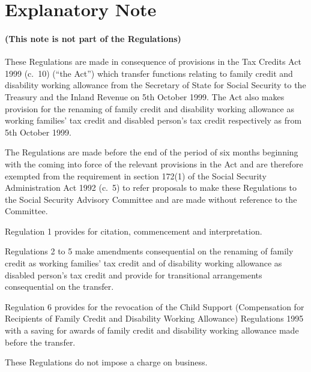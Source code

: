 \documentclass[12pt,a4paper]{article}
\begin{document}
\part{Explanatory Note}

\renewcommand\parthead{— Explanatory Note}

\subsection*{(This note is not part of the Regulations)}

These Regulations are made in consequence of provisions in the Tax Credits Act 1999 (c.\ 10) (“the Act”) which transfer functions relating to family credit and disability working allowance from the Secretary of State for Social Security to the Treasury and the Inland Revenue on 5th October 1999. The Act also makes provision for the renaming of family credit and disability working allowance as working families' tax credit and disabled person’s tax credit respectively as from 5th October 1999.

The Regulations are made before the end of the period of six months beginning with the coming into force of the relevant provisions in the Act and are therefore exempted from the requirement in section 172(1) of the Social Security Administration Act 1992 (c.\ 5) to refer proposals to make these Regulations to the Social Security Advisory Committee and are made without reference to the Committee.

Regulation 1 provides for citation, commencement and interpretation.

Regulations 2 to 5 make amendments consequential on the renaming of family credit as working families' tax credit and of disability working allowance as disabled person’s tax credit and provide for transitional arrangements consequential on the transfer.

Regulation 6 provides for the revocation of the Child Support (Compensation for Recipients of Family Credit and Disability Working Allowance) Regulations 1995 with a saving for awards of family credit and disability working allowance made before the transfer.

These Regulations do not impose a charge on business. 
\end{document}

